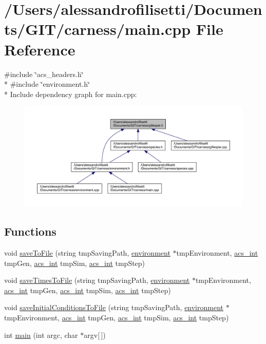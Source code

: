 \hypertarget{a00069}{\section{/\-Users/alessandrofilisetti/\-Documents/\-G\-I\-T/carness/main.cpp File Reference}
\label{a00069}
}
{\ttfamily \#include \char`\"{}acs\-\_\-headers.\-h\char`\"{}}\\*
{\ttfamily \#include \char`\"{}environment.\-h\char`\"{}}\\*
Include dependency graph for main.\-cpp\-:
\nopagebreak
\begin{figure}[H]
\begin{center}
\leavevmode
\includegraphics[width=350pt]{a00189}
\end{center}
\end{figure}
\subsection*{Functions}
\begin{DoxyCompactItemize}
\item 
void \hyperlink{a00069_acac21f7e718db9d00451e3caaaacc25f}{save\-To\-File} (string tmp\-Saving\-Path, \hyperlink{a00014}{environment} $\ast$tmp\-Environment, \hyperlink{a00050_a8d277355641a098190360234e2ebde35}{acs\-\_\-int} tmp\-Gen, \hyperlink{a00050_a8d277355641a098190360234e2ebde35}{acs\-\_\-int} tmp\-Sim, \hyperlink{a00050_a8d277355641a098190360234e2ebde35}{acs\-\_\-int} tmp\-Step)
\item 
void \hyperlink{a00069_a2bf310904bc4e1fb5669e548525c4ba7}{save\-Times\-To\-File} (string tmp\-Saving\-Path, \hyperlink{a00014}{environment} $\ast$tmp\-Environment, \hyperlink{a00050_a8d277355641a098190360234e2ebde35}{acs\-\_\-int} tmp\-Gen, \hyperlink{a00050_a8d277355641a098190360234e2ebde35}{acs\-\_\-int} tmp\-Sim, \hyperlink{a00050_a8d277355641a098190360234e2ebde35}{acs\-\_\-int} tmp\-Step)
\item 
void \hyperlink{a00069_a4665c5f33b43dfc8fae4757552028cc0}{save\-Initial\-Conditions\-To\-File} (string tmp\-Saving\-Path, \hyperlink{a00014}{environment} $\ast$tmp\-Environment, \hyperlink{a00050_a8d277355641a098190360234e2ebde35}{acs\-\_\-int} tmp\-Gen, \hyperlink{a00050_a8d277355641a098190360234e2ebde35}{acs\-\_\-int} tmp\-Sim, \hyperlink{a00050_a8d277355641a098190360234e2ebde35}{acs\-\_\-int} tmp\-Step)
\item 
int \hyperlink{a00069_a0ddf1224851353fc92bfbff6f499fa97}{main} (int argc, char $\ast$argv\mbox{[}$\,$\mbox{]})
\end{DoxyCompactItemize}


